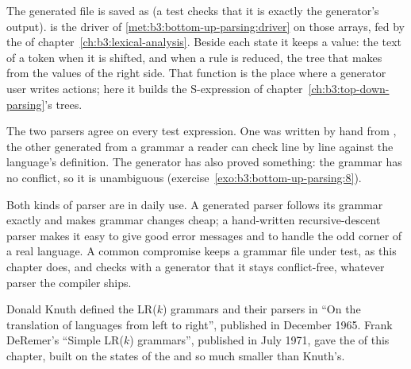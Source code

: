 \label{out:b3:bottom-up-parsing:lrgen}

The generated file is saved as  (a test checks that it is exactly the generator's output).  is the driver of \cref{met:b3:bottom-up-parsing:driver} on those arrays, fed by the  of chapter~\ref{ch:b3:lexical-analysis}. Beside each state it keeps a value: the text of a token when it is shifted, and when a rule is reduced, the tree that  makes from the values of the right side. That function is the place where a generator user writes actions; here it builds the S-expression of chapter~\ref{ch:b3:top-down-parsing}'s trees.

\label{lst:b3:bottom-up-parsing:lrmoor}

\label{out:b3:bottom-up-parsing:lrmoor}

The two parsers agree on every test expression. One was written by hand from , the other generated from a grammar a reader can check line by line against the language's definition. The generator has also proved something: the grammar has no conflict, so it is unambiguous (exercise~\ref{exo:b3:bottom-up-parsing:8}).

\begin{inpractice}
Both kinds of parser are in daily use. A generated parser follows its grammar exactly and makes grammar changes cheap; a hand-written recursive-descent parser makes it easy to give good error messages and to handle the odd corner of a real language. A common compromise keeps a grammar file under test, as this chapter does, and checks with a generator that it stays conflict-free, whatever parser the compiler ships.
\end{inpractice}

\begin{history}[LR parsing]
Donald Knuth defined the LR($k$) grammars and their parsers in ``On the translation of languages from left to right'', published in December 1965. %
Frank DeRemer's ``Simple LR($k$) grammars'', published in July 1971, gave the  of this chapter, built on the states of the  and so much smaller than Knuth's. %
\end{history}

